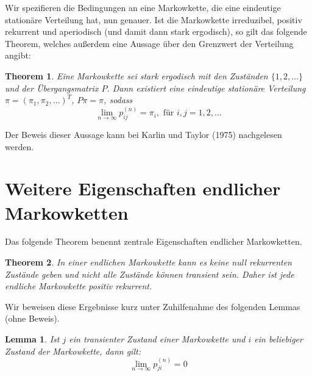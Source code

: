 \documentclass{article}
\newtheorem{thm}{Theorem}
\newtheorem{lemma}{Lemma}
\begin{document}
Wir spezifieren die Bedingungen an eine Markowkette, die eine eindeutige stationäre Verteilung hat, nun genauer. Ist die Markowkette irreduzibel,
positiv rekurrent und aperiodisch (und damit dann stark
ergodisch), so gilt das folgende Theorem, welches außerdem eine Aussage über den Grenzwert der Verteilung angibt:
\begin{thm}
  \label{tm0}
  Eine Markowkette sei stark ergodisch mit den Zuständen
  $\{1,2,\dots\}$ und der Übergangsmatrix $P$. Dann existiert eine
  eindeutige stationäre Verteilung $π = (π_1,π_2,\dots)^T$, $Pπ = π$,
  sodass
  \[
    \lim_{n →∞}p_{ij}^{(n)} = π_i, \text{ für } i,j=1,2,\dots
  \]
\end{thm}
Der Beweis dieser Aussage kann bei Karlin und Taylor (1975) \cite{kt} nachgelesen werden.
\section{Weitere Eigenschaften endlicher Markowketten}
Das folgende Theorem benennt zentrale Eigenschaften endlicher
Markowketten.
\begin{thm}
  \label{tm1}
In einer endlichen Markowkette kann es keine
null rekurrenten Zustände geben und nicht alle Zustände
können transient sein. Daher ist jede endliche Markowkette positiv
rekurrent.  
\end{thm}
Wir beweisen diese Ergebnisse kurz unter Zuhilfenahme des folgenden
Lemmas (ohne Beweis).
\begin{lemma}
  \label{lm1}
  Ist $j$ ein transienter Zustand einer Markowkette und $i$ ein
  beliebiger Zustand der Markowkette, dann gilt:
  \[
    \lim_{n→∞} p_{ji}^{(n)} = 0
  \]
\end{lemma}
\end{document}
